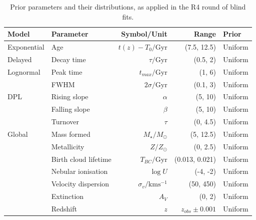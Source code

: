 \documentclass[a4paper,12pt]{article}
\begin{document}
\begin{table}[h]
  \centering
  \begin{tabular}{l l r r l}
    Model       & Parameter            & Symbol/Unit                  & Range             & Prior   \\
    \hline \hline
    Exponential & Age                  & $t(z)-T_0/\mathrm{Gyr}$      & (7.5, 12.5)       & Uniform \\
    Delayed     & Decay time           & $\tau/\mathrm{Gyr}$          & (0.5, 2)          & Uniform \\
    \hline
    Lognormal   & Peak time            & $t_{max}/\mathrm{Gyr}$       & (1, 6)            & Uniform \\
                & FWHM                 & $2\sigma/\mathrm{Gyr}$       & (0.1, 3)          & Uniform \\
    \hline
    DPL         & Rising slope         & $\alpha$                     & (5, 10)           & Uniform \\
                & Falling slope        & $\beta$                      & (5, 10)           & Uniform \\
                & Turnover             & $\tau$                       & (0, 4.5)          & Uniform \\
    \hline
    Global      & Mass formed          & $M_\star/M_\odot$            & (5, 12.5)         & Uniform \\
                & Metallicity          & $Z/Z_\odot$                  & (0, 2.5)          & Uniform \\
                & Birth cloud lifetime & $T_{BC}/\mathrm{Gyr}$        & (0.013, 0.021)    & Uniform \\
                & Nebular ionisation   & $\log{U}$                    & (-4, -2)          & Uniform \\
                & Velocity dispersion  & $\sigma_v/\mathrm{kms^{-1}}$ & (50, 450)         & Uniform \\
                & Extinction           & $A_V$                        & (0, 2)            & Uniform \\
                & Redshift             & $z$                          & $z_{obs}\pm0.001$ & Uniform \\
    \hline
  \end{tabular}
  \caption{Prior parameters and their distributions, as applied in the R4 round of blind fits.}
  \label{tab:r4_priors}
\end{table}
\end{document}
